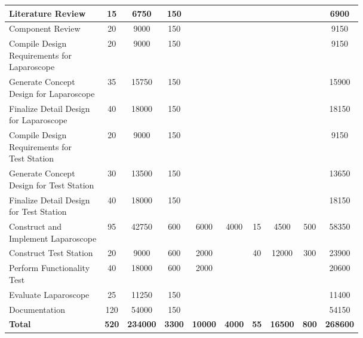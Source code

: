 \begin{landscape}
\begin{table}[H]
\begin{tabular}{|l|c|c|c|c|c|c|c|c|c|}
            Literature Review           & 15  & 6750   & 150  &       &      &    &       &     & 6900   \\
        \hline
            Component Review            & 20  & 9000   & 150  &       &      &    &       &     & 9150   \\
        \hline
            \makecell[l]{Compile Design \\ Requirements for \\ Laparoscope}
                            & 20  & 9000   & 150  &       &      &    &       &     & 9150   \\
        \hline
            \makecell[l]{Generate Concept \\ Design for Laparoscope}
                            & 35  & 15750  & 150  &       &      &    &       &     & 15900  \\
        \hline
            \makecell[l]{Finalize Detail Design \\ for Laparoscope}
                            & 40  & 18000  & 150  &       &      &    &       &     & 18150  \\
        \hline
            \makecell[l]{Compile Design \\ Requirements for \\ Test Station}
                            & 20  & 9000   & 150  &       &      &    &       &     & 9150   \\
        \hline
            \makecell[l]{Generate Concept \\ Design for Test Station}
                            & 30  & 13500  & 150  &       &      &    &       &     & 13650  \\
        \hline
            \makecell[l]{Finalize Detail Design \\ for Test Station}
                            & 40  & 18000  & 150  &       &      &    &       &     & 18150  \\
        \hline
            \makecell[l]{Construct and \\ Implement Laparoscope}
                            & 95  & 42750  & 600  & 6000  & 4000 & 15 & 4500  & 500 & 58350  \\
        \hline
            Construct Test Station      & 20  & 9000   & 600  & 2000  &      & 40 & 12000 & 300 & 23900  \\
        \hline
            \makecell[l]{Perform Functionality \\ Test}
                            & 40  & 18000  & 600  & 2000  &      &    &       &     & 20600  \\
        \hline
            Evaluate Laparoscope        & 25  & 11250  & 150  &       &      &    &       &     & 11400  \\
        \hline
            Documentation               & 120 & 54000  & 150  &       &      &    &       &     & 54150  \\
        \hline
            \textbf{Total}              & \textbf{520} & \textbf{234000} & \textbf{3300} & \textbf{10000} & \textbf{4000} & \textbf{55} & \textbf{16500} & \textbf{800} & \textbf{268600} \\
        \hline


\end{tabular}
\end{table}
\end{landscape}
